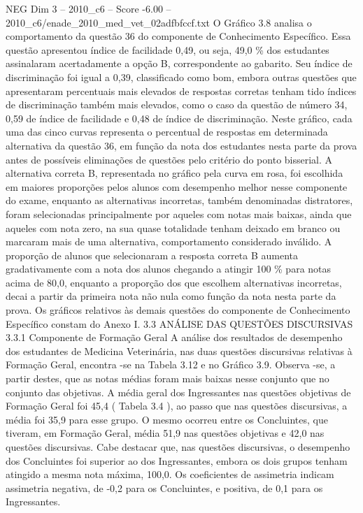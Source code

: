 \begin{textsample}{NEG Dim 3 – 2010\_c6 – Score -6.00 – 2010\_c6/enade\_2010\_med\_vet\_02adfbfccf.txt}
O Gráfico 3.8 analisa o comportamento da questão 36 do componente de Conhecimento Específico.
Essa questão apresentou índice de facilidade 0,49, ou seja, 49,0 \% dos estudantes assinalaram acertadamente a opção B, correspondente ao gabarito.
Seu índice de discriminação foi igual a 0,39, classificado como bom, embora outras questões que apresentaram percentuais mais elevados de respostas corretas tenham tido índices de discriminação também mais elevados, como o caso da questão de número 34, 0,59 de índice de facilidade e 0,48 de índice de discriminação.
Neste gráfico, cada uma das cinco curvas representa o percentual de respostas em determinada alternativa da questão 36, em função da nota dos estudantes nesta parte da prova antes de possíveis eliminações de questões pelo critério do ponto bisserial.
A alternativa correta B, representada no gráfico pela curva em rosa, foi escolhida em maiores proporções pelos alunos com desempenho melhor nesse componente do exame, enquanto as alternativas incorretas, também denominadas distratores, foram selecionadas principalmente por aqueles com notas mais baixas, ainda que aqueles com nota zero, na sua quase totalidade tenham deixado em branco ou marcaram mais de uma alternativa, comportamento considerado inválido.
A proporção de alunos que selecionaram a resposta correta B aumenta gradativamente com a nota dos alunos chegando a atingir 100 \% para notas acima de 80,0, enquanto a proporção dos que escolhem alternativas incorretas, decai a partir da primeira nota não nula como função da nota nesta parte da prova.
Os gráficos relativos às demais questões do componente de Conhecimento Específico constam do Anexo I. 3.3 ANÁLISE DAS QUESTÕES DISCURSIVAS 3.3.1 Componente de Formação Geral A análise dos resultados de desempenho dos estudantes de Medicina Veterinária, nas duas questões discursivas relativas à Formação Geral, encontra -se na Tabela 3.12 e no Gráfico 3.9.
Observa -se, a partir destes, que as notas médias foram mais baixas nesse conjunto que no conjunto das objetivas.
A média geral dos Ingressantes nas questões objetivas de Formação Geral foi 45,4 ( Tabela 3.4 ), ao passo que nas questões discursivas, a média foi 35,9 para esse grupo.
O mesmo ocorreu entre os Concluintes, que tiveram, em Formação Geral, média 51,9 nas questões objetivas e 42,0 nas questões discursivas.
Cabe destacar que, nas questões discursivas, o desempenho dos Concluintes foi superior ao dos Ingressantes, embora os dois grupos tenham atingido a mesma nota máxima, 100,0.
Os coeficientes de assimetria indicam assimetria negativa, de -0,2 para os Concluintes, e positiva, de 0,1 para os Ingressantes.

\end{textsample}
